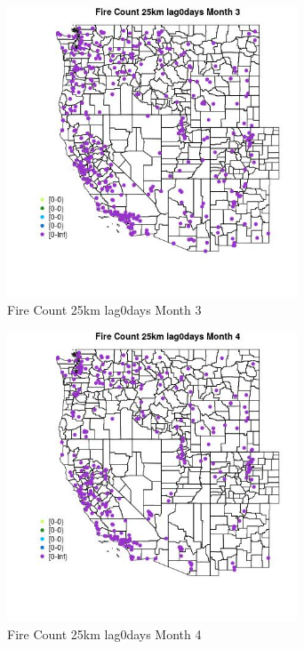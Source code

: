 \begin{figure} 
\centering  
\includegraphics[width=0.77\textwidth]{Code_Outputs/Report_ML_input_PM25_Step4_part_e_de_duplicated_aves_compiled_2019-05-18wNAs_MapObsMo3Fire_Count_25km_lag0days.jpg} 
\caption{\label{fig:Report_ML_input_PM25_Step4_part_e_de_duplicated_aves_compiled_2019-05-18wNAsMapObsMo3Fire_Count_25km_lag0days}Fire Count 25km lag0days Month 3} 
\end{figure} 
 

\begin{figure} 
\centering  
\includegraphics[width=0.77\textwidth]{Code_Outputs/Report_ML_input_PM25_Step4_part_e_de_duplicated_aves_compiled_2019-05-18wNAs_MapObsMo4Fire_Count_25km_lag0days.jpg} 
\caption{\label{fig:Report_ML_input_PM25_Step4_part_e_de_duplicated_aves_compiled_2019-05-18wNAsMapObsMo4Fire_Count_25km_lag0days}Fire Count 25km lag0days Month 4} 
\end{figure} 
 

